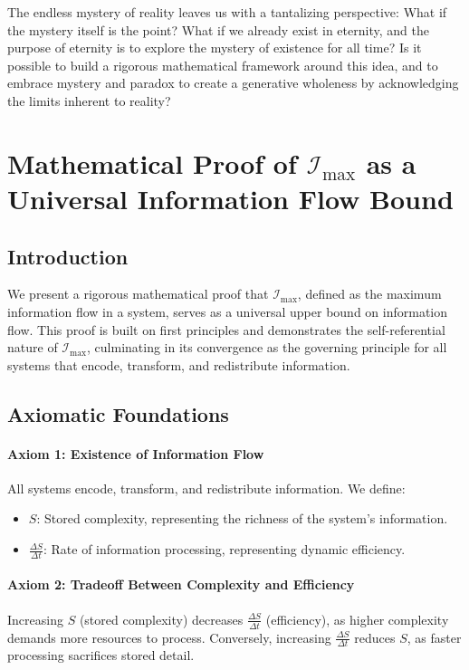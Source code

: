 \documentclass[12pt]{article}
\begin{document}
The endless mystery of reality leaves us with a tantalizing perspective: What if the mystery itself is the point? What if we already exist in eternity, and the purpose of eternity is to explore the mystery of existence for all time? Is it possible to build a rigorous mathematical framework around this idea, and to embrace mystery and paradox to create a generative wholeness by acknowledging the limits inherent to reality?


\section{Mathematical Proof of \(\mathcal{I}_{\text{max}}\) as a Universal Information Flow Bound}

\subsection{Introduction}
We present a rigorous mathematical proof that \(\mathcal{I}_{\text{max}}\), defined as the maximum information flow in a system, serves as a universal upper bound on information flow. This proof is built on first principles and demonstrates the self-referential nature of \(\mathcal{I}_{\text{max}}\), culminating in its convergence as the governing principle for all systems that encode, transform, and redistribute information.

\subsection{Axiomatic Foundations}

\paragraph{Axiom 1: Existence of Information Flow}
All systems encode, transform, and redistribute information. We define:
\begin{itemize}
    \item \(S\): Stored complexity, representing the richness of the system's information.
    \item \(\frac{\Delta S}{\Delta t}\): Rate of information processing, representing dynamic efficiency.
\end{itemize}

\paragraph{Axiom 2: Tradeoff Between Complexity and Efficiency}
Increasing \(S\) (stored complexity) decreases \(\frac{\Delta S}{\Delta t}\) (efficiency), as higher complexity demands more resources to process. Conversely, increasing \(\frac{\Delta S}{\Delta t}\) reduces \(S\), as faster processing sacrifices stored detail.
\end{document}
